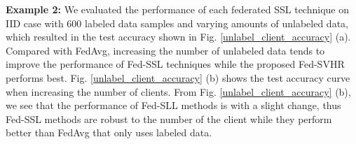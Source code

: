 \documentclass[twoside,journal]{IEEEtran}
\begin{document}
\textbf{Example 2:} We evaluated the performance of each federated  SSL technique on IID case with 600 labeled data samples and varying amounts of unlabeled data, which resulted in the test accuracy shown in Fig. \ref{unlabel_client_accuracy} (a). Compared with  FedAvg, increasing the number of unlabeled data tends to improve the performance of Fed-SSL
techniques while the proposed Fed-SVHR performs best. Fig. \ref{unlabel_client_accuracy} (b) shows the test accuracy curve when increasing the number of clients. From  Fig. \ref{unlabel_client_accuracy} (b), we see that the performance of Fed-SLL methods is with a slight change, thus Fed-SSL methods are robust to the number of the client while they perform better than FedAvg that only uses labeled data.
\begin{figure*}[t]
\centering
\vspace{-1cm}
%
\hspace{-2.1cm}
%
\centering
\caption{Test accuracy curves of the proposed Fed-SVHR and the baseline on IID \& Non-IID cases when varying the number of communication rounds. }
\label{test_accuracy}
\end{figure*}
\begin{figure*}[t]
\centering
\vspace{-0.5cm}
%
\hspace{-2.1cm}
%
\centering
\caption{The test accuracy curves of the proposed Fed-SVHR and the baseline on IID case when varying the number of unlabeled data and clients.
 }
\label{unlabel_client_accuracy}
\vspace{-0.2cm}
\end{figure*}
\end{document}

